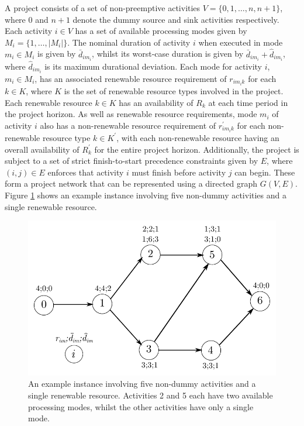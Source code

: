 \documentclass[a4paper,abstracton]{scrartcl}
\begin{document}
A project consists of a set of non-preemptive activities $V=\{0,1,\dots,n,n+1\}$, where 0 and $n+1$ denote the dummy source and sink activities respectively. Each activity $i\in V$ has a set of available processing modes given by $M_i=\{1,\dots,|M_i|\}$. The nominal duration of activity $i$ when executed in mode $m_i\in M_i$ is given by $\bar{d}_{im_i}$, whilst its worst-case duration is given by $\bar{d}_{im_i}+\hat{d}_{im_i}$, where $\hat{d}_{im_i}$ is its maximum durational deviation. Each mode for activity $i$, $m_i\in M_i$, has an associated renewable resource requirement of $r_{im_ik}$ for each $k\in K$, where $K$ is the set of renewable resource types involved in the project. Each renewable resource $k\in K$ has an availability of $R_{k}$ at each time period in the project horizon. As well as renewable resource requirements, mode $m_i$ of activity $i$ also has a non-renewable resource requirement of $r^{'}_{im_ik}$ for each non-renewable resource type $k\in K^{'}$, with each non-renewable resource having an overall availability of $R^{'}_k$ for the entire project horizon. Additionally, the project is subject to a set of strict finish-to-start precedence constraints given by $E$, where $(i,j)\in E$ enforces that activity $i$ must finish before activity $j$ can begin. These form a project network that can be represented using a directed graph $G(V,E)$. Figure \ref{fig:mrcpsp_network} shows an example instance involving five non-dummy activities and a single renewable resource.

\begin{figure}[h]
	\centering
	\includegraphics[scale=1]{mrcpsp_network.pdf}
	\caption{An example instance involving five non-dummy activities and a single renewable resource. Activities 2 and 5 each have two available processing modes, whilst the other activities have only a single mode.}
	\label{fig:mrcpsp_network}
\end{figure}
\end{document}
